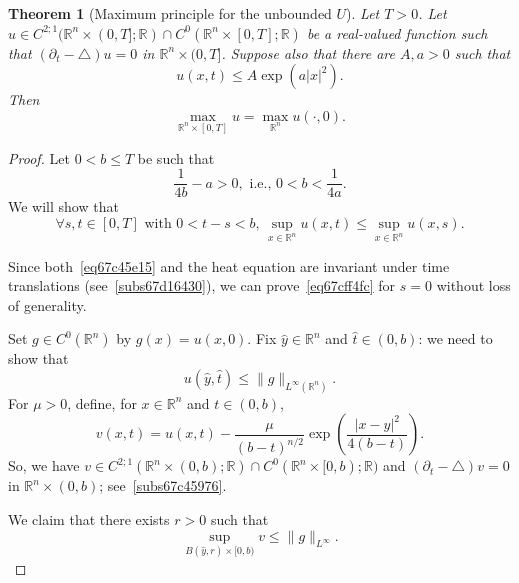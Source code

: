 \documentclass[a4paper,9pt]{amsart}
\newcommand{\R}{\mathbb{R}}	%
\newcommand{\de}{\partial}		%
\newcommand{\laplacian}{\triangle}
\theoremstyle{plain}
\newtheorem{theorem}[proposition]{Theorem}
\theoremstyle{definition}
\theoremstyle{remark}
\begin{document}
\begin{theorem}[Maximum principle for the unbounded $U$]\label{thm67c4584f}
	Let $T>0$.
	Let $u\in C^{2;1}(\R^n\times(0,T];\R)\cap C^0(\R^n\times[0,T];\R)$ be a real-valued function such that $(\de_t-\laplacian)u=0$ in $\R^n\times(0,T]$.
	Suppose also that there are $A,a>0$ such that
	\begin{equation}\label{eq67c45e15}
		u(x,t) \le A\exp(a|x|^2) .
	\end{equation}
	Then
	\begin{equation}\label{eq67c4584a}
		\max_{\R^n\times[0,T]} u = \max_{\R^n} u(\cdot,0) .
	\end{equation}
\end{theorem}
\begin{proof}
	Let $0<b\le T$ be such that
	\begin{equation}
		\frac1{4b} - a > 0 ,
		\text{ i.e., }
		0<b<\frac1{4a} .
	\end{equation}
	We will show that
	\begin{equation}\label{eq67cff4fc}
		\forall s,t\in[0,T]\text{ with $0<t-s<b$, }
		\sup_{x\in\R^n} u(x,t) \le \sup_{x\in\R^n} u(x,s) .
	\end{equation}
	
	Since both~\eqref{eq67c45e15} and the heat equation are invariant under time translations (see~\ref{subs67d16430}), we can prove~\eqref{eq67cff4fc} for $s=0$ without loss of generality.
	
	Set $g\in C^0(\R^n)$ by $g(x) = u(x,0)$.
	Fix $\hat y\in\R^n$ and $\hat t\in(0,b)$: we need to show that
	\begin{equation}\label{eq67cff5ae}
		u(\hat y,\hat t) \le \|g\|_{L^\infty(\R^n)} .
	\end{equation}
	For $\mu>0$, define, for $x\in\R^n$ and $t\in(0,b)$,
	\begin{equation}\label{eq67c4590e}
		v(x,t) = u(x,t) - \frac{\mu}{(b-t)^{n/2}} \exp\left( \frac{|x-\hat y|^2}{4(b-t)} \right) .
	\end{equation}
	So, we have 
	$v\in C^{2;1}(\R^n\times(0,b);\R)\cap C^0(\R^n\times[0,b);\R)$
	and $(\de_t-\laplacian)v = 0$ in $\R^n\times(0,b)$;
	see~\ref{subs67c45976}.
	
	We claim that there exists $r>0$ such that
	\begin{equation}\label{eq67cff772}
		\sup_{B(\hat y,r)\times[0,b)}v  \le \|g\|_{L^\infty} .
	\end{equation}
	

\end{proof}
\end{document}
